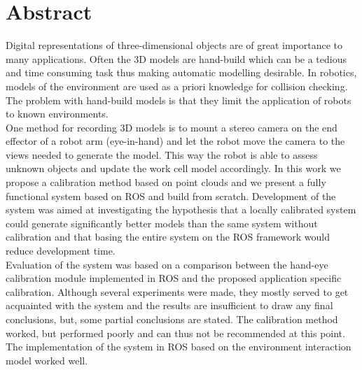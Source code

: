 \chapter*{Abstract}
Digital representations of three-dimensional objects are of great importance to many applications. Often the 3D models are hand-build which can be a tedious and time consuming task thus making automatic modelling desirable. In robotics, models of the environment are used as a priori knowledge for collision checking. The problem with hand-build models is that they limit the application of robots to known environments. \\

One method for recording 3D models is to mount a stereo camera on the end effector of a robot arm (eye-in-hand) and let the robot move the camera to the views needed to generate the model. This way the robot is able to assess unknown objects and update the work cell model accordingly. In this work we propose a calibration method based on point clouds and we present a fully functional system based on ROS and build from scratch. Development of the system was aimed at investigating the hypothesis that a locally calibrated system could generate significantly better models than the same system without calibration and that basing the entire system on the ROS framework would reduce development time. \\

Evaluation of the system was based on a comparison between the hand-eye calibration module implemented in ROS and the proposed application specific calibration. Although several experiments were made, they mostly served to get acquainted with the system and the results are insufficient to draw any final conclusions, but, some partial conclusions are stated. The calibration method worked, but performed poorly and can thus not be recommended at this point. The implementation of the system in ROS based on the environment interaction model worked well. \\